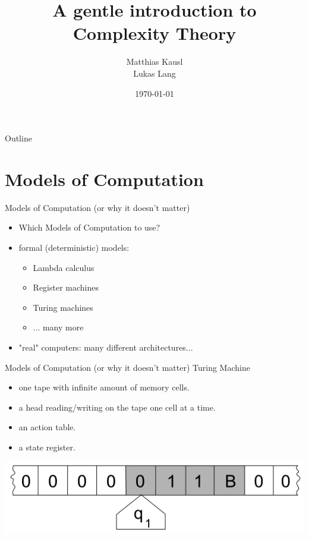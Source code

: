 \documentclass[c]{beamer}
\title{A gentle introduction to Complexity Theory}
\author{Matthias Kausl \\ Lukas Lang}
\institute{Vienna University of Technology}
\date{\today}
\begin{document}
\begin{frame}
\titlepage
\end{frame}

\begin{frame}{Outline}
	\tableofcontents
\end{frame}


\section{Models of Computation}
\begin{frame}{Models of Computation (or why it doesn't matter)}
          \begin{itemize}
			\item Which Models of Computation to use?
			\item formal (deterministic) models:
			\begin{itemize}
				\item Lambda calculus
				\item Register machines
				\item Turing machines
				\item ... many more
			\end{itemize}
			\item "real" computers: many different architectures...
		  \end{itemize}
\end{frame}		

\begin{frame}{Models of Computation (or why it doesn't matter)}  
Turing Machine

 \begin{itemize}
			\item one tape with infinite amount of memory cells.
			\item a head reading/writing on the tape one cell at a time.
			\item an action table.
			\item a state register.
 \end{itemize}
 
\begin{center}
 \includegraphics[scale=0.3]{images/tm.png} 
\end{center}
\end{frame}	
\end{document}
